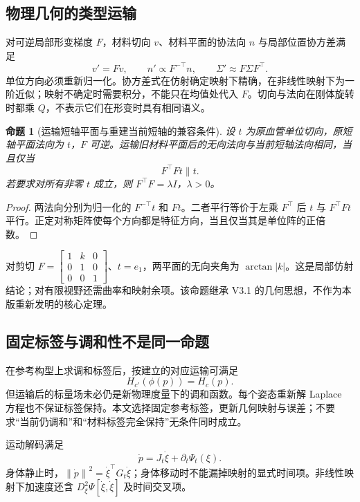 \documentclass[UTF8,fontset=fandol,11pt,a4paper]{ctexart}
\theoremstyle{plain}
\newtheorem{proposition}[theorem]{命题}
\theoremstyle{definition}
\theoremstyle{remark}
\numberwithin{equation}{section}
\newcommand{\norm}[1]{\left\lVert#1\right\rVert}
\begin{document}
\subsection{物理几何的类型运输}
对可逆局部形变梯度 $F$，材料切向 $v$、材料平面的协法向 $n$ 与局部位置协方差满足
\begin{equation}
 v'=Fv,\qquad n'\propto F^{-\top}n,\qquad
 \Sigma'\approx F\Sigma F^\top.
 \label{eq:transport}
\end{equation}
单位方向必须重新归一化。协方差式在仿射确定映射下精确，在非线性映射下为一阶近似；映射不确定时需要积分，不能只在均值处代入 $F$。切向与法向在刚体旋转时都乘 $Q$，不表示它们在形变时具有相同语义。

\begin{proposition}[运输短轴平面与重建当前短轴的兼容条件]
\label{prop:plane}
设 $t$ 为原血管单位切向，原短轴平面法向为 $t$，$F$ 可逆。运输旧材料平面后的无向法向与当前短轴法向相同，当且仅当
\begin{equation}
 F^\top Ft\parallel t.
 \label{eq:compatibility}
\end{equation}
若要求对所有非零 $t$ 成立，则 $F^\top F=\lambda I$，$\lambda>0$。
\end{proposition}
\begin{proof}
两法向分别为归一化的 $F^{-\top}t$ 和 $Ft$。二者平行等价于左乘 $F^\top$ 后 $t$ 与 $F^\top Ft$ 平行。正定对称矩阵使每个方向都是特征方向，当且仅当其是单位阵的正倍数。
\end{proof}
对剪切 $F=\left[\begin{smallmatrix}1&k&0\\0&1&0\\0&0&1\end{smallmatrix}\right]$、$t=e_1$，两平面的无向夹角为 $\arctan|k|$。这是局部仿射结论；对有限视野还需曲率和映射余项。该命题继承 V3.1 的几何思想，不作为本版重新发明的核心定理\cite{v31}。

\subsection{固定标签与调和性不是同一命题}
在参考构型上求调和标签后，按建立的对应运输可满足
\begin{equation}
 H_{c'}(\phi(p))=H_c(p).
\end{equation}
但运输后的标量场未必仍是新物理度量下的调和函数。每个姿态重新解 Laplace 方程也不保证标签保持。本文选择固定参考标签，更新几何映射与误差；不要求“当前仍调和”和“材料标签完全保持”无条件同时成立。

运动解码满足
\begin{equation}
 \dot p=J_t\dot\xi+\partial_t\Psi_t(\xi).
 \label{eq:velocitymap}
\end{equation}
身体静止时，$\norm{\dot p}^2=\dot\xi^\top G_t\dot\xi$；身体移动时不能漏掉映射的显式时间项。非线性映射下加速度还含 $D_\xi^2\Psi[\dot\xi,\dot\xi]$ 及时间交叉项。
\end{document}
